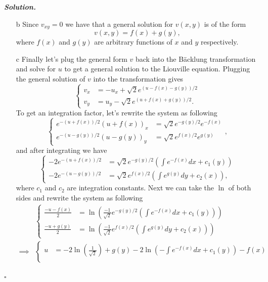 \documentclass[12pt]{report}
\newenvironment{solution}[1][\it{Solution}]{\textbf{#1. } }{$\square$}
\newcommand{\paren}[1]{{\left(#1\right)}} %
\begin{document}
\begin{solution}
\begin{enumerate}
        \item [b]
        Since $v_{xy} = 0$ we have that a general solution for $v(x,y)$ is of the form
        \[
            v(x,y) = f(x) + g(y),
        \]
        where $f(x)$ and $g(y)$ are arbitrary functions of $x$ and $y$ respectively.
        
        \item [c]
        Finally let's plug the general form $v$ back into the B\"acklung transformation and solve for $u$ to get a general solution to the Liouville equation. Plugging the general solution of $v$ into the transformation gives
        \[ 
            \begin{cases}
                v_x &= -u_x + \sqrt{2}e^{(u-f(x)-g(y))/2}\\
                v_y &= u_y - \sqrt{2}e^{(u+f(x)+g(y))/2}.
            \end{cases}
        \]
        To get an integration factor, let's rewrite the system as following
        \[ 
            \begin{cases}
                e^{-(u+f(x))/2}(u+f(x))_x &= \sqrt{2}e^{-g(y)/2}e^{-f(x)}\\
                e^{-(u - g(y))/2}(u - g(y))_y &= \sqrt{2}e^{f(x)/2}e^{g(y)}
            \end{cases},
        \]
        and after integrating we have
        \[ 
            \begin{cases}
                -2e^{-(u + f(x))/2} &= \sqrt{2}e^{-g(y)/2}\paren{\int e^{-f(x)}dx + c_1(y)}\\
                -2e^{-(u-g(y))/2} &= \sqrt{2}e^{f(x)/2}\paren{\int e^{g(y)}dy + c_2(x)},
            \end{cases}
        \]
        where $c_1$ and $c_2$ are integration constants. Next we can take the $\ln$ of both sides and rewrite the system as following
        \begin{align*}
            &\begin{cases}
                \frac{-u - f(x)}{2} &= \ln\paren{\frac{-1}{\sqrt{2}}e^{-g(y)/2}\paren{\int e^{-f(x)}dx + c_1(y)}}\\
                \frac{-u + g(y)}{2} &= \ln\paren{\frac{-1}{\sqrt{2}}e^{f(x)/2}\paren{\int e^{g(y)}dy + c_2(x)}}
            \end{cases}\\
            \implies &\begin{cases}
                u &= -2\ln\paren{\frac{1}{\sqrt{2}}} + g(y) -2\ln\paren{-\int e^{-f(x)}dx + c_1(y)} - f(x)\\

\end{cases}
\end{align*}
\end{enumerate}
\end{solution}
\end{document}
